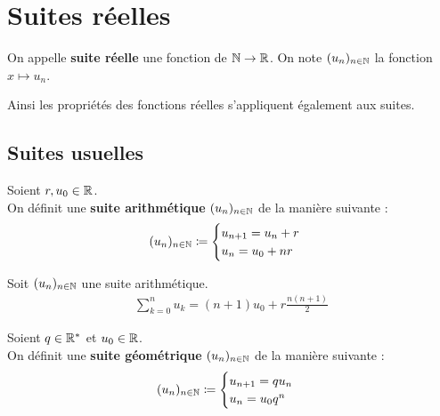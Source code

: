 \chapter{Suites réelles}
\def\arraystretch{1}

\begin{definition}
    On appelle \textbf{suite réelle} une fonction de $\mathbb{N} \to \mathbb{R}$. 
    On note $(u_n)_{n \in \mathbb{N}}$ la fonction $x \mapsto u_n$.
\end{definition}

\begin{remark}
    Ainsi les propriétés des fonctions réelles s'appliquent également aux suites.
\end{remark}

\section{Suites usuelles}
\begin{definition}
    Soient $r, u_0 \in \mathbb{R}$.
    \\
    On définit une \textbf{suite arithmétique} $(u_n)_{n \in \mathbb{N}}$ de la manière suivante :
    \begin{align*}
        (u_n)_{n \in \mathbb{N}} \coloneqq
        \begin{cases}
            u_{n+1} = u_n + r \\ 
            u_n = u_0 + nr
        \end{cases}
    \end{align*}
\end{definition}

\begin{proposition}
    Soit $(u_n)_{n \in \mathbb{N}}$ une suite arithmétique.
    \begin{align*}
        \sum_{k = 0}^{n} u_k = (n+1)u_0 + r \frac{n(n+1)}{2}
    \end{align*}
\end{proposition}

\begin{definition}
    Soient $q \in \mathbb{R}^*$ et $u_0 \in \mathbb{R}$.
    \\
    On définit une \textbf{suite géométrique} $(u_n)_{n \in \mathbb{N}}$ de la manière suivante : 
    \begin{align*}
        (u_n)_{n \in \mathbb{N}} \coloneqq 
        \begin{cases}
            u_{n+1} = qu_n \\
            u_n = u_0 q^n
        \end{cases}
    \end{align*}
\end{definition}

